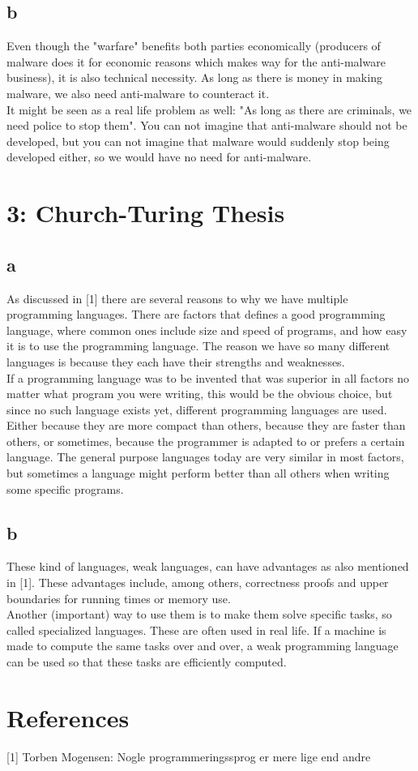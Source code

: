 \documentclass[12pt]{article}
\begin{document}
\subsection*{b}
Even though the "warfare" benefits both parties economically (producers of malware does it for economic reasons which makes way for the anti-malware business), it is also technical necessity. As long as there is money in making malware, we also need anti-malware to counteract it. \\
It might be seen as a real life problem as well: "As long as there are criminals, we need police to stop them". You can not imagine that anti-malware should not be developed, but you can not imagine that malware would suddenly stop being developed either, so we would have no need for anti-malware.


\section*{3: Church-Turing Thesis}
\subsection*{a}
As discussed in [1] there are several reasons to why we have multiple programming languages. There are factors that defines a good programming language, where common ones include size and speed of programs, and how easy it is to use the programming language. The reason we have so many different languages is because they each have their strengths and weaknesses.\\
If a programming language was to be invented that was superior in all factors no matter what program you were writing, this would be the obvious choice, but since no such language exists yet, different programming languages are used. Either because they are more compact than others, because they are faster than others, or sometimes, because the programmer is adapted to or prefers a certain language. The general purpose languages today are very similar in most factors, but sometimes a language might perform better than all others when writing some specific programs.

\subsection*{b}
These kind of languages, weak languages, can have advantages as also mentioned in [1]. These advantages include, among others, correctness proofs and upper boundaries for running times or memory use. \\
Another (important) way to use them is to make them solve specific tasks, so called specialized languages. These are often used in real life. If a machine is made to compute the same tasks over and over, a weak programming language can be used so that these tasks are efficiently computed.

\section*{References}
[1] Torben Mogensen: Nogle programmeringssprog er mere lige end andre
\end{document}
